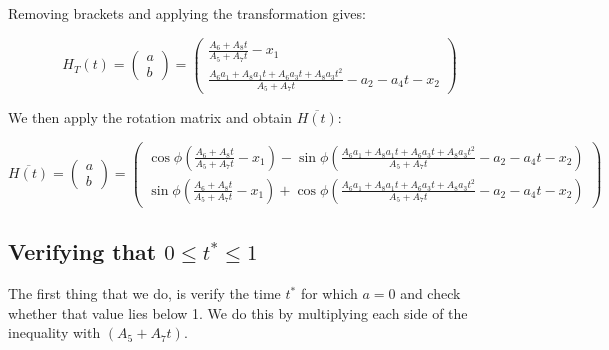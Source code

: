 \documentclass{article}
\begin{document}
Removing brackets and applying the transformation gives:

  \begin{equation*}
   H_T(t) = \left( \begin{array}{c}
         a  \\
         b 
    \end{array}  \right) = 
    \left( \begin{array}{c}
         \frac{ A_6 + A_8 t}
      { A_5  + A_7 t } - x_1 \\
         \frac{ A_6 a_1 + A_8 a_1 t + A_6 a_3 t + A_8 a_3 t^2 }{A_5 + A_7t} - a_2 - a_4 t - x_2
    \end{array}  \right)
  \end{equation*}
  
We then apply the rotation matrix and obtain $\overline{H(t)}$:

\begin{equation*}
   \overline{H(t)} = \left( \begin{array}{c}
         a  \\
         b 
    \end{array}  \right) = 
    \left( \begin{array}{c}
        \cos \phi \left(\frac{ A_6 + A_8 t}
      { A_5  + A_7 t } - x_1 \right) - \sin \phi \left(\frac{ A_6 a_1 + A_8 a_1 t + A_6 a_3 t + A_8 a_3 t^2 }{A_5 + A_7t} - a_2 - a_4 t - x_2 \right) \\
         \sin \phi \left(\frac{ A_6 + A_8 t}
      { A_5  + A_7 t } - x_1 \right)  + \cos \phi \left( \frac{ A_6 a_1 + A_8 a_1 t + A_6 a_3 t + A_8 a_3 t^2 }{A_5 + A_7t} - a_2 - a_4 t - x_2 \right)
    \end{array}  \right)
\end{equation*}

\subsection{Verifying that $0 \le t^* \le 1$}

The first thing that we do, is verify the time $t^*$ for which $a=0$ and check whether that value lies below 1. We do this by multiplying each side of the inequality with $(A_5 + A_7 t)$.
\end{document}
